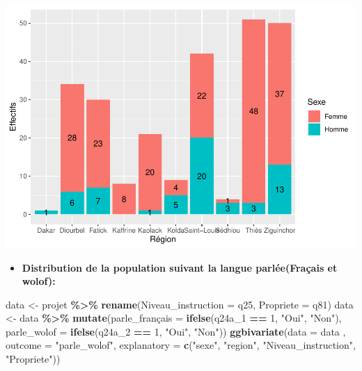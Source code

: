\documentclass[
]{article}
\newenvironment{Shaded}{\begin{snugshade}}{\end{snugshade}}
\newcommand{\AttributeTok}[1]{\textcolor[rgb]{0.13,0.29,0.53}{#1}}
\newcommand{\DecValTok}[1]{\textcolor[rgb]{0.00,0.00,0.81}{#1}}
\newcommand{\FunctionTok}[1]{\textcolor[rgb]{0.13,0.29,0.53}{\textbf{#1}}}
\newcommand{\NormalTok}[1]{#1}
\newcommand{\OtherTok}[1]{\textcolor[rgb]{0.56,0.35,0.01}{#1}}
\newcommand{\SpecialCharTok}[1]{\textcolor[rgb]{0.81,0.36,0.00}{\textbf{#1}}}
\newcommand{\StringTok}[1]{\textcolor[rgb]{0.31,0.60,0.02}{#1}}
\providecommand{\tightlist}{%
  \setlength{\itemsep}{0pt}\setlength{\parskip}{0pt}}
\begin{document}
\includegraphics{RMarkdown_files/figure-latex/unnamed-chunk-15-1.pdf}

\begin{itemize}
\tightlist
\item
  \textbf{Distribution de la population suivant la langue parlée(Fraçais
  et wolof):}
\end{itemize}

\begin{Shaded}
\begin{Highlighting}[]
\NormalTok{data }\OtherTok{\textless{}{-}}\NormalTok{ projet }\SpecialCharTok{\%\textgreater{}\%} 
  \FunctionTok{rename}\NormalTok{(}\AttributeTok{Niveau\_instruction =}\NormalTok{ q25, }\AttributeTok{Propriete =}\NormalTok{ q81)}
\NormalTok{data }\OtherTok{\textless{}{-}}\NormalTok{ data }\SpecialCharTok{\%\textgreater{}\%}
  \FunctionTok{mutate}\NormalTok{(parle\_français }\OtherTok{=} \FunctionTok{ifelse}\NormalTok{(q24a\_1 }\SpecialCharTok{==} \DecValTok{1}\NormalTok{, }\StringTok{"Oui"}\NormalTok{, }\StringTok{"Non"}\NormalTok{),}
         \AttributeTok{parle\_wolof =} \FunctionTok{ifelse}\NormalTok{(q24a\_2 }\SpecialCharTok{==} \DecValTok{1}\NormalTok{, }\StringTok{"Oui"}\NormalTok{, }\StringTok{"Non"}\NormalTok{))}
\FunctionTok{ggbivariate}\NormalTok{(}\AttributeTok{data =}\NormalTok{ data , }\AttributeTok{outcome =} \StringTok{"parle\_wolof"}\NormalTok{, }\AttributeTok{explanatory =} \FunctionTok{c}\NormalTok{(}\StringTok{"sexe"}\NormalTok{, }\StringTok{"region"}\NormalTok{, }\StringTok{"Niveau\_instruction"}\NormalTok{, }\StringTok{"Propriete"}\NormalTok{))}
\end{Highlighting}
\end{Shaded}
\end{document}
